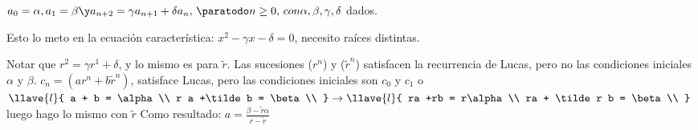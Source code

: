 $a_0 = \alpha, a_1 = \beta \y a_{n+2} = \gamma a_{n+1} +\delta a_n,\, \paratodo n \geq 0,\, con \alpha, \beta, \gamma, \delta $ dados.\par
Esto lo meto en la ecuación característica: $x^2 - \gamma x -\delta = 0$, necesito raíces distintas.\par
Notar que $r^2 = \gamma r^1 + \delta$, y lo mismo es para $\tilde r$. Las sucesiones ($r^n$) y ($\tilde r^n$) satisfacen la recurrencia de Lucas,
pero no las condiciones iniciales $\alpha$ y $\beta$.
$c_n = (a r^n + b \tilde r^n)$, satisface Lucas, pero las condiciones iniciales son $c_0$ y $c_1$ o
$
  \llave{l}{
    a + b = \alpha\\
    r a +\tilde b = \beta\\
  }\to
  \llave{l}{
    ra +rb = r\alpha\\
    ra + \tilde r b = \beta\\
  }
$ luego hago lo mismo con $\tilde r$
Como resultado: $a = \frac{\beta - \tilde r \alpha}{r - \tilde r}$
